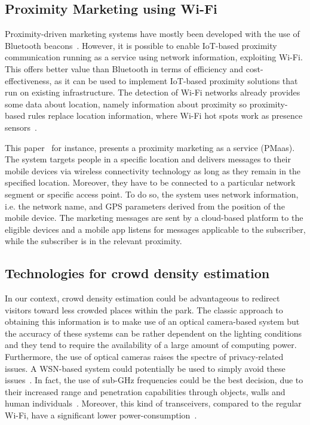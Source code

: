 \subsection{Proximity Marketing using Wi-Fi}\label{sec:situated-recommendation-system-technologies}
Proximity-driven marketing systems have mostly been developed with the use of Bluetooth beacons~\cite{mndebele2017iot}. However, it is possible to
enable IoT-based proximity communication running as a service using network information, exploiting Wi-Fi. This offers better value than Bluetooth in
terms of efficiency and cost-effectiveness, as it can be used to implement IoT-based proximity solutions that run on existing infrastructure. The
detection of Wi-Fi networks already provides some data about location, namely information about proximity so proximity-based rules replace location
information, where Wi-Fi hot spots work as presence sensors~\cite{dmitry2013network}.

This paper~\cite{mndebele2017iot} for instance, presents a proximity marketing as a service (PMaas). The system targets people in a specific location
and delivers messages to their mobile devices via wireless connectivity technology as long as they remain in the specified location. Moreover, they
have to be connected to a particular network segment or specific access point. To do so, the system uses network information, i.e. the network name,
and GPS parameters derived from the position of the mobile device. The marketing messages are sent by a cloud-based platform to the eligible devices
and a mobile app listens for messages applicable to the subscriber, while the subscriber is in the relevant proximity.

\subsection{Technologies for crowd density estimation}\label{subsec:sub-ghz-wireless-sensor-network-for-crowd-density-estimation}
In our context, crowd density estimation could be advantageous to redirect visitors toward less crowded places within the park. The classic approach
to obtaining this information is to make use of an optical camera-based system but the accuracy of these systems can be rather dependent on the
lighting conditions and they tend to require the availability of a large amount of computing power. Furthermore, the use of optical cameras raises
the spectre of privacy-related issues. A WSN-based system could potentially be used to simply avoid these issues~\cite{denis2018large}. In fact, the
use of sub-GHz frequencies could be the best decision, due to their increased range and penetration capabilities through objects, walls and human
individuals~\cite{denis2018large}. Moreover, this kind of transceivers, compared to the regular Wi-Fi, have a significant lower
power-consumption~\cite{fudickar2014comparing}.

